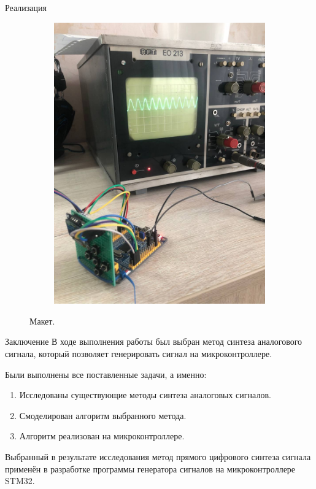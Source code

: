 \documentclass[10pt]{beamer}
\begin{document}
\begin{frame}{Реализация}
\begin{figure}
\begin{subfigure}[H]{0.45\textwidth}
         \includegraphics[width=\textwidth]{2}
     \end{subfigure}
        \caption{Макет.}
\end{figure}
\end{frame}


\begin{frame}{Заключение}
	В ходе выполнения работы был выбран метод синтеза аналогового сигнала, который позволяет генерировать сигнал на микроконтроллере.
	
	Были выполнены все поставленные задачи, а именно:
	\begin{enumerate}
		\item Исследованы существующие методы синтеза аналоговых сигналов.
		\item Смоделирован алгоритм выбранного метода.
		\item Алгоритм реализован на микроконтроллере.
	\end{enumerate}
	
	Выбранный в результате исследования метод прямого цифрового синтеза сигнала применён в разработке программы генератора сигналов на микроконтроллере STM32.
\end{frame}
\end{document}

